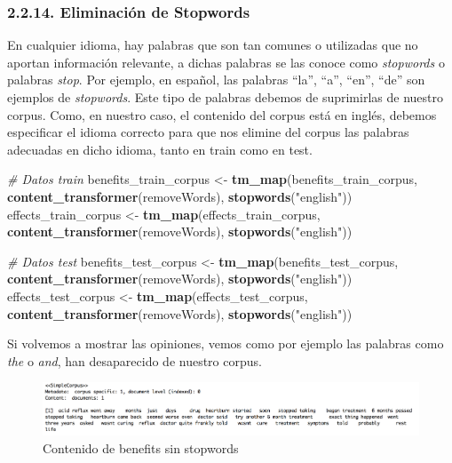 \documentclass[spanish,]{article}
\newenvironment{Shaded}{\begin{snugshade}}{\end{snugshade}}
\newcommand{\KeywordTok}[1]{\textcolor[rgb]{0.13,0.29,0.53}{\textbf{#1}}}
\newcommand{\StringTok}[1]{\textcolor[rgb]{0.31,0.60,0.02}{#1}}
\newcommand{\CommentTok}[1]{\textcolor[rgb]{0.56,0.35,0.01}{\textit{#1}}}
\newcommand{\NormalTok}[1]{#1}
\begin{document}
\subsubsection{2.2.14. Eliminación de
Stopwords}\label{eliminacion-de-stopwords}

En cualquier idioma, hay palabras que son tan comunes o utilizadas que
no aportan información relevante, a dichas palabras se las conoce como
\emph{stopwords} o palabras \emph{stop}. Por ejemplo, en español, las
palabras ``la'', ``a'', ``en'', ``de'' son ejemplos de \emph{stopwords}.
Este tipo de palabras debemos de suprimirlas de nuestro corpus. Como, en
nuestro caso, el contenido del corpus está en inglés, debemos
especificar el idioma correcto para que nos elimine del corpus las
palabras adecuadas en dicho idioma, tanto en train como en test.

\begin{Shaded}
\begin{Highlighting}[]
\CommentTok{# Datos train}
\NormalTok{benefits_train_corpus <-}\StringTok{ }\KeywordTok{tm_map}\NormalTok{(benefits_train_corpus, }\KeywordTok{content_transformer}\NormalTok{(removeWords), }
                                \KeywordTok{stopwords}\NormalTok{(}\StringTok{"english"}\NormalTok{))}
\NormalTok{effects_train_corpus <-}\StringTok{ }\KeywordTok{tm_map}\NormalTok{(effects_train_corpus, }\KeywordTok{content_transformer}\NormalTok{(removeWords), }
                               \KeywordTok{stopwords}\NormalTok{(}\StringTok{"english"}\NormalTok{))}

\CommentTok{# Datos test}
\NormalTok{benefits_test_corpus <-}\StringTok{ }\KeywordTok{tm_map}\NormalTok{(benefits_test_corpus, }\KeywordTok{content_transformer}\NormalTok{(removeWords), }
                               \KeywordTok{stopwords}\NormalTok{(}\StringTok{"english"}\NormalTok{))}
\NormalTok{effects_test_corpus <-}\StringTok{ }\KeywordTok{tm_map}\NormalTok{(effects_test_corpus, }\KeywordTok{content_transformer}\NormalTok{(removeWords), }
                              \KeywordTok{stopwords}\NormalTok{(}\StringTok{"english"}\NormalTok{))}
\end{Highlighting}
\end{Shaded}

Si volvemos a mostrar las opiniones, vemos como por ejemplo las palabras
como \emph{the} o \emph{and}, han desaparecido de nuestro corpus.

\begin{figure}[h]
    \centering
    \includegraphics[width=1\textwidth]{imagenes/benefits_stopwords.png}
    \caption{Contenido de benefits sin stopwords}
    \label{benefits2}
\end{figure}
\end{document}

